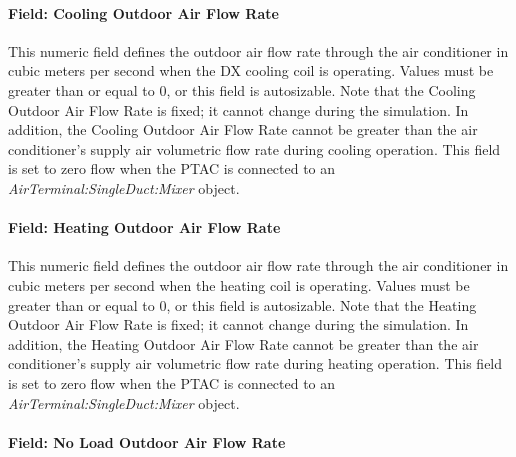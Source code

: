 \paragraph{Field: Cooling Outdoor Air Flow Rate}\label{field-cooling-outdoor-air-flow-rate-001}

This numeric field defines the outdoor air flow rate through the air conditioner in cubic meters per second when the DX cooling coil is operating. Values must be greater than or equal to 0, or this field is autosizable. Note that the Cooling Outdoor Air Flow Rate is fixed; it cannot change during the simulation. In addition, the Cooling Outdoor Air Flow Rate cannot be greater than the air conditioner's supply air volumetric flow rate during cooling operation. This field is set to zero flow when the PTAC is connected to an \textit{AirTerminal:SingleDuct:Mixer} object.

\paragraph{Field: Heating Outdoor Air Flow Rate}\label{field-heating-outdoor-air-flow-rate-001}

This numeric field defines the outdoor air flow rate through the air conditioner in cubic meters per second when the heating coil is operating. Values must be greater than or equal to 0, or this field is autosizable. Note that the Heating Outdoor Air Flow Rate is fixed; it cannot change during the simulation. In addition, the Heating Outdoor Air Flow Rate cannot be greater than the air conditioner's supply air volumetric flow rate during heating operation. This field is set to zero flow when the PTAC is connected to an \textit{AirTerminal:SingleDuct:Mixer} object.

\paragraph{Field: No Load Outdoor Air Flow Rate}\label{field-no-load-outdoor-air-flow-rate-000}

